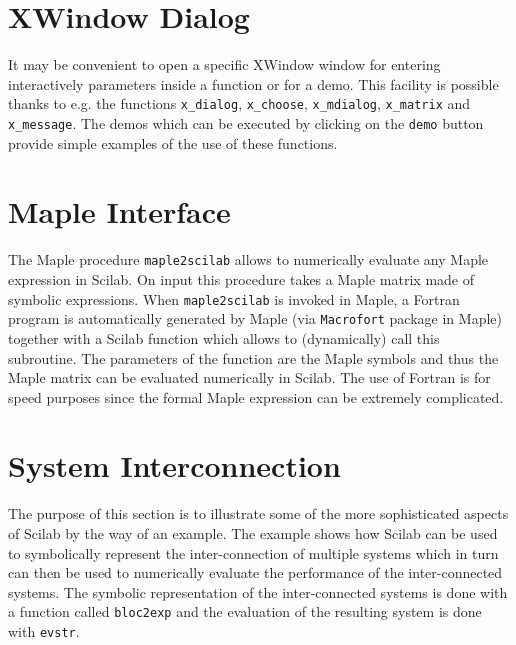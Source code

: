 \section{XWindow Dialog}
It may be convenient to open a specific XWindow window for entering
interactively parameters inside a function or for a demo.
This facility is possible thanks to e.g. the functions \verb!x_dialog!,
\verb!x_choose!, \verb!x_mdialog!, \verb!x_matrix! and \verb!x_message!.
The demos which can be executed by clicking on the {\tt demo} button
provide simple examples of the use of these functions.

\section{Maple Interface}
The Maple procedure {\tt maple2scilab} allows to numerically evaluate
any Maple expression in Scilab.
On input this procedure takes a Maple matrix made of symbolic
expressions. When {\tt maple2scilab} is invoked in Maple,
a Fortran program is automatically generated by Maple 
(via {\tt Macrofort} package in Maple) together with a Scilab function which 
allows to (dynamically) call this subroutine.
The parameters of the function are the Maple symbols and thus the Maple
matrix can be evaluated numerically in Scilab. The use of Fortran
is for speed purposes since the formal Maple expression can be
extremely complicated.

\section{System Interconnection}
	The purpose of this section is to illustrate some
of the more sophisticated aspects of Scilab by the way of an example.
The example shows how Scilab can be used to symbolically represent
the inter-connection of multiple systems which in turn can 
then be used to numerically evaluate the performance of the
inter-connected systems.  The symbolic representation of the
inter-connected systems is done with a function called {\tt bloc2exp}
and the evaluation of the resulting system is done with
{\tt evstr}.

